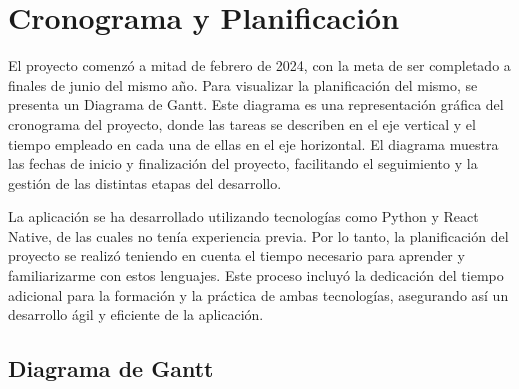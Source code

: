 \section{Cronograma y Planificación}

El proyecto comenzó a mitad de febrero de 2024, con la meta de ser completado a finales de junio del mismo año. Para visualizar la planificación del mismo, se presenta un Diagrama de Gantt. Este diagrama es una representación gráfica del cronograma del proyecto, donde las tareas se describen en el  eje vertical y el tiempo empleado en cada una de ellas en el eje horizontal. El diagrama muestra las fechas de inicio y finalización del proyecto, facilitando el seguimiento y la gestión de las distintas etapas del desarrollo.

La aplicación se ha desarrollado utilizando tecnologías como Python y React Native, de las cuales no tenía experiencia previa. Por lo tanto, la planificación del proyecto se realizó teniendo en cuenta el tiempo necesario para aprender y familiarizarme con estos lenguajes. Este proceso incluyó la dedicación del tiempo adicional para la formación y la práctica de ambas tecnologías, asegurando así un desarrollo ágil y eficiente de la aplicación.

\subsection{Diagrama de Gantt}


